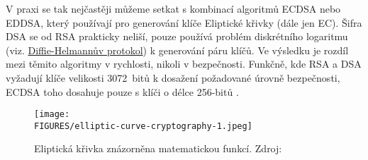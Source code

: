 V praxi se tak nejčastěji můžeme setkat s kombinací algoritmů ECDSA nebo \mbox{EDDSA}, který používají pro generování klíče Eliptické křivky (dále jen EC). Šifra DSA se od RSA prakticky neliší, pouze používá problém diskrétního logaritmu (viz. \hyperref[sec:diffie-hellman]{Diffie-Helmannův protokol}) k generování páru klíčů. Ve výsledku je rozdíl mezi těmito algoritmy v rychlosti, nikoli v bezpečnosti. Funkčně, kde RSA a DSA vyžadují klíče velikosti 3072~bitů k dosažení požadované úrovně bezpečnosti, \mbox{ECDSA} toho dosahuje pouze s klíči o délce 256-bitů \parencite{kontsevoy2020}.

\begin{figure}[htbp]
    \centering
    \texttt{[image: \\FIGURES/elliptic-curve-cryptography-1.jpeg]}
    \caption{Eliptická křivka znázorněna matematickou funkcí. Zdroj: \parencite{eliptic-curve-1}}
    \label{fig:elliptic-curve-cryptography}
  \end{figure}
\newpage